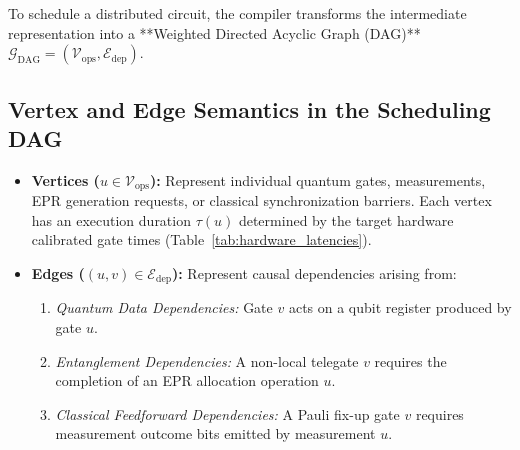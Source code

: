To schedule a distributed circuit, the compiler transforms the intermediate representation into a **Weighted Directed Acyclic Graph (DAG)** $\mathcal{G}_{\text{DAG}} = (\mathcal{V}_{\text{ops}}, \mathcal{E}_{\text{dep}})$.

\subsection{Vertex and Edge Semantics in the Scheduling DAG}
\begin{itemize}
    \item \textbf{Vertices ($u \in \mathcal{V}_{\text{ops}}$):} Represent individual quantum gates, measurements, EPR generation requests, or classical synchronization barriers. Each vertex has an execution duration $\tau(u)$ determined by the target hardware calibrated gate times (Table~\ref{tab:hardware_latencies}).
    \item \textbf{Edges ($(u, v) \in \mathcal{E}_{\text{dep}}$):} Represent causal dependencies arising from:
    \begin{enumerate}
        \item \textit{Quantum Data Dependencies:} Gate $v$ acts on a qubit register produced by gate $u$.
        \item \textit{Entanglement Dependencies:} A non-local telegate $v$ requires the completion of an EPR allocation operation $u$.
        \item \textit{Classical Feedforward Dependencies:} A Pauli fix-up gate $v$ requires measurement outcome bits emitted by measurement $u$.
    \end{enumerate}
\end{itemize}

